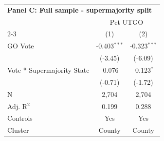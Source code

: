 \begingroup
\centering
\begin{tabular*}{\textwidth}{@{\extracolsep{\fill}}lcc}
\multicolumn{5}{l}{\textbf{Panel C: Full sample - supermajority split}}\\

\addlinespace
   \toprule
    & \multicolumn{2}{c}{Pct UTGO}\\
   \cmidrule(lr){2-3}
                              & (1)            & (2)\\  
   \midrule 
   GO Vote                    & -0.403$^{***}$ & -0.323$^{***}$\\   
                              & (-3.45)        & (-6.09)\\   
   Vote * Supermajority State & -0.076         & -0.123$^{*}$\\   
                              & (-0.71)       & (-1.72)\\   
   \hline
   N               & 2,704          & 2,704\\  
   Adj. R$^2$             & 0.199          & 0.288\\  
   Controls                   & Yes            & Yes\\
   Cluster              & County & County\\  
   \bottomrule
\end{tabular*}
\par\endgroup
